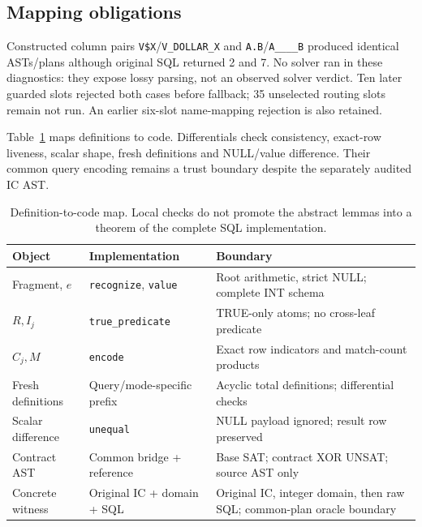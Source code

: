 \documentclass[3p,times,authoryear]{elsarticle}
\begin{document}


\subsection{Mapping obligations}\label{sec:mapping}
Constructed column pairs \texttt{V\$X}/\texttt{V\_DOLLAR\_X} and \texttt{A.B}/\texttt{A\_\_\_\_B} produced identical ASTs/plans although original SQL returned 2 and 7. No solver ran in these diagnostics: they expose lossy parsing, not an observed solver verdict. Ten later guarded slots rejected both cases before fallback; 35 unselected routing slots remain not run. An earlier six-slot name-mapping rejection is also retained.

Table~\ref{tab:mapping} maps definitions to code. Differentials check consistency, exact-row liveness, scalar shape, fresh definitions and NULL/value difference. Their common query encoding remains a trust boundary despite the separately audited IC AST.

\begin{table}[htbp]
\centering\small
\begin{tabularx}{\textwidth}{p{}p{}X}
\toprule
Object & Implementation & Boundary\\
\midrule
Fragment, $e$ & \texttt{recognize}, \texttt{value} & Root arithmetic, strict NULL; complete INT schema\\
$R,I_j$ & \texttt{true\_predicate} & TRUE-only atoms; no cross-leaf predicate\\
$C_j,M$ & \texttt{encode} & Exact row indicators and match-count products\\
Fresh definitions & Query/mode-specific prefix & Acyclic total definitions; differential checks\\
Scalar difference & \texttt{unequal} & NULL payload ignored; result row preserved\\
Contract AST & Common bridge + reference & Base SAT; contract XOR UNSAT; source AST only\\
Concrete witness & Original IC + domain + SQL & Original IC, integer domain, then raw SQL; common-plan oracle boundary\\
\bottomrule
\end{tabularx}
\caption{Definition-to-code map. Local checks do not promote the abstract lemmas into a theorem of the complete SQL implementation.}\label{tab:mapping}
\end{table}
\end{document}
